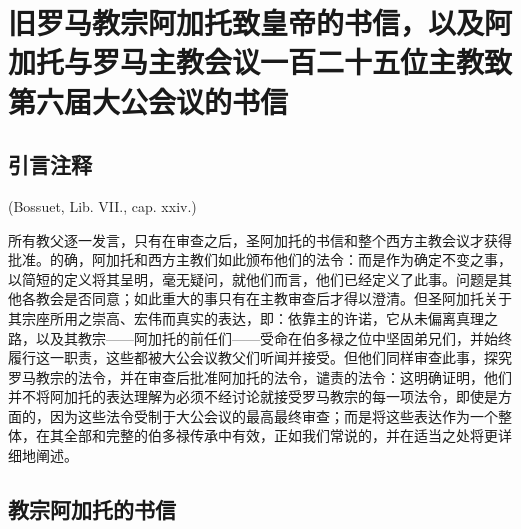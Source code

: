 
\section{旧罗马教宗阿加托致皇帝的书信，以及阿加托与罗马主教会议一百二十五位主教致第六届大公会议的书信}

\par


\subsection{引言注释}

(Bossuet,  Lib. VII., cap. xxiv.)\par

所有教父逐一发言，只有在审查之后，圣阿加托的书信和整个西方主教会议才获得批准。的确，阿加托和西方主教们如此颁布他们的法令：而是作为确定不变之事，以简短的定义将其呈明，毫无疑问，就他们而言，他们已经定义了此事。问题是其他各教会是否同意；如此重大的事只有在主教审查后才得以澄清。但圣阿加托关于其宗座所用之崇高、宏伟而真实的表达，即：依靠主的许诺，它从未偏离真理之路，以及其教宗——阿加托的前任们——受命在伯多禄之位中坚固弟兄们，并始终履行这一职责，这些都被大公会议教父们听闻并接受。但他们同样审查此事，探究罗马教宗的法令，并在审查后批准阿加托的法令，谴责的法令：这明确证明，他们并不将阿加托的表达理解为必须不经讨论就接受罗马教宗的每一项法令，即使是方面的，因为这些法令受制于大公会议的最高最终审查；而是将这些表达作为一个整体，在其全部和完整的伯多禄传承中有效，正如我们常说的，并在适当之处将更详细地阐述。\par


\subsection{教宗阿加托的书信}

